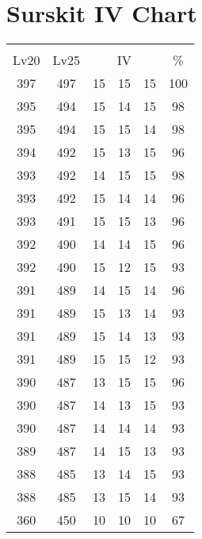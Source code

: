 \documentclass{article}%
\begin{document}
%
\normalsize%
\section{Surskit IV Chart}%
\label{sec:Surskit IV Chart}%
\renewcommand{\arraystretch}{1.5}%
\begin{tabular}{|c|c|c|c|c|c|}%
\hline%
\multicolumn{6}{|c|}{\textcolor{white}{ 
\linebreak{Surskit}
}%
\cellcolor{black}}\\%
\multicolumn{1}{|c}{Lv20}&\multicolumn{1}{c|}{Lv25}&\multicolumn{3}{c|}{IV}&\multicolumn{1}{|c|}{\%}\\%
\hline%
\rowcolor{color100}%
397&497&15&15&15&100\\%
\hline%
\rowcolor{color98}%
395&494&15&14&15&98\\%
\hline%
\rowcolor{color98}%
395&494&15&15&14&98\\%
\hline%
\rowcolor{color96}%
394&492&15&13&15&96\\%
\hline%
\rowcolor{color98}%
393&492&14&15&15&98\\%
\hline%
\rowcolor{color96}%
393&492&15&14&14&96\\%
\hline%
\rowcolor{color96}%
393&491&15&15&13&96\\%
\hline%
\rowcolor{color96}%
392&490&14&14&15&96\\%
\hline%
\rowcolor{color93}%
392&490&15&12&15&93\\%
\hline%
\rowcolor{color96}%
391&489&14&15&14&96\\%
\hline%
\rowcolor{color93}%
391&489&15&13&14&93\\%
\hline%
\rowcolor{color93}%
391&489&15&14&13&93\\%
\hline%
\rowcolor{color93}%
391&489&15&15&12&93\\%
\hline%
\rowcolor{color96}%
390&487&13&15&15&96\\%
\hline%
\rowcolor{color93}%
390&487&14&13&15&93\\%
\hline%
\rowcolor{color93}%
390&487&14&14&14&93\\%
\hline%
\rowcolor{color93}%
389&487&14&15&13&93\\%
\hline%
\rowcolor{color93}%
388&485&13&14&15&93\\%
\hline%
\rowcolor{color93}%
388&485&13&15&14&93\\%
\hline%
\rowcolor{color91}%
360&450&10&10&10&67\\%
\end{tabular}

%
\end{document}

